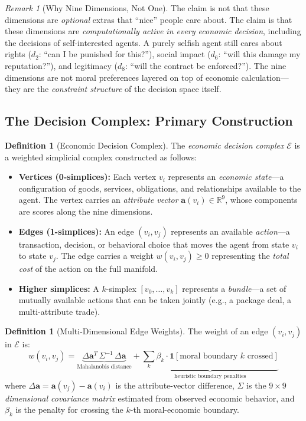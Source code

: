 \documentclass[12pt]{article}
\theoremstyle{definition}
\newtheorem{definition}[theorem]{Definition}
\theoremstyle{remark}
\newtheorem{remark}[theorem]{Remark}
\newcommand{\E}{\mathcal{E}}               %
\newcommand{\R}{\mathbb{R}}
\begin{document}
\begin{remark}[Why Nine Dimensions, Not One]
The claim is not that these dimensions are \emph{optional} extras that ``nice'' people care about.  The claim is that these dimensions are \emph{computationally active in every economic decision}, including the decisions of self-interested agents.  A purely selfish agent still cares about rights ($d_2$: ``can I be punished for this?''), social impact ($d_6$: ``will this damage my reputation?''), and legitimacy ($d_8$: ``will the contract be enforced?'').  The nine dimensions are not moral preferences layered on top of economic calculation---they are the \emph{constraint structure} of the decision space itself.
\end{remark}

\subsection{The Decision Complex: Primary Construction}

\begin{definition}[Economic Decision Complex]
\label{def:econ_complex}
The \emph{economic decision complex} $\E$ is a weighted simplicial complex constructed as follows:
\begin{itemize}
    \item \textbf{Vertices (0-simplices):} Each vertex $v_i$ represents an \emph{economic state}---a configuration of goods, services, obligations, and relationships available to the agent.  The vertex carries an \emph{attribute vector} $\mathbf{a}(v_i) \in \R^9$, whose components are scores along the nine dimensions.
    \item \textbf{Edges (1-simplices):} An edge $(v_i, v_j)$ represents an available \emph{action}---a transaction, decision, or behavioral choice that moves the agent from state $v_i$ to state $v_j$.  The edge carries a weight $w(v_i, v_j) \geq 0$ representing the \emph{total cost} of the action on the full manifold.
    \item \textbf{Higher simplices:} A $k$-simplex $[v_0, \ldots, v_k]$ represents a \emph{bundle}---a set of mutually available actions that can be taken jointly (e.g., a package deal, a multi-attribute trade).
\end{itemize}
\end{definition}

\begin{definition}[Multi-Dimensional Edge Weights]
\label{def:edge_weights}
The weight of an edge $(v_i, v_j)$ in $\E$ is:
\begin{equation}
w(v_i, v_j) = \underbrace{\Delta \mathbf{a}^T\, \Sigma^{-1}\, \Delta \mathbf{a}}_{\text{Mahalanobis distance}} + \underbrace{\sum_k \beta_k \cdot \mathbf{1}[\text{moral boundary } k \text{ crossed}]}_{\text{heuristic boundary penalties}}
\label{eq:edge_weight}
\end{equation}
where $\Delta \mathbf{a} = \mathbf{a}(v_j) - \mathbf{a}(v_i)$ is the attribute-vector difference, $\Sigma$ is the $9 \times 9$ \emph{dimensional covariance matrix} estimated from observed economic behavior, and $\beta_k$ is the penalty for crossing the $k$-th moral-economic boundary.
\end{definition}
\end{document}
